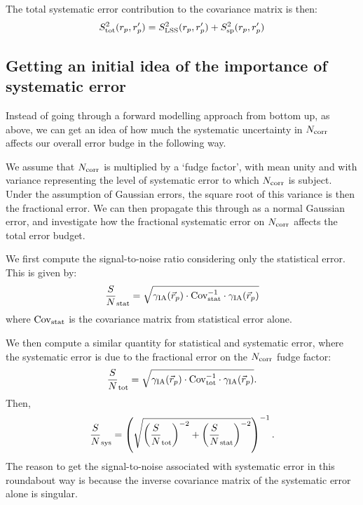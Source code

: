 \documentclass[onecolumn,amsmath,aps,fleqn, superscriptaddress]{revtex4}
\begin{document}
The total systematic error contribution to the covariance matrix is then:
\begin{equation}
S_{\rm tot}^2(r_p, r_p^\prime) = S_{\rm LSS}^2(r_p, r_p^\prime) + S_{\rm sp}^2(r_p, r_p^\prime) 
\label{sysall}
\end{equation}

\subsection{Getting an initial idea of the importance of systematic error}
Instead of going through a forward modelling approach from bottom up, as above, we can get an idea of how much the systematic uncertainty in $N_{\rm corr}$ affects our overall error budge in the following way. 

We assume that $N_{\rm corr}$ is multiplied by a `fudge factor', with mean unity and with variance representing the level of systematic error to which $N_{\rm corr}$ is subject. Under the assumption of Gaussian errors, the square root of this variance is then the fractional error. We can then propagate this through as a normal Gaussian error, and investigate how the fractional systematic error on $N_{\rm corr}$ affects the total error budget.

We first compute the signal-to-noise ratio considering only the statistical error. This is given by:
\begin{equation}
\frac{S}{N}_{\rm stat} = \sqrt{\gamma_{\rm IA}(\vec{r}_p) \cdot {\rm Cov}_{\rm stat}^{-1} \cdot \gamma_{\rm IA}(\vec{r}_p)}
\label{statStoN}
\end{equation}
where ${\rm Cov}_{\rm stat}$ is the covariance matrix from statistical error alone. 

We then compute a similar quantity for statistical and systematic error, where the systematic error is due to the fractional error on the $N_{\rm corr}$ fudge factor:
\begin{equation}
\frac{S}{N}_{\rm tot} = \sqrt{\gamma_{\rm IA}(\vec{r}_p) \cdot {\rm Cov}_{\rm tot}^{-1} \cdot \gamma_{\rm IA}(\vec{r}_p)}.
\label{totStoN}
\end{equation}
Then,
\begin{equation}
\frac{S}{N}_{\rm sys} = \left(\sqrt{\left(\frac{S}{N}_{\rm tot}\right)^{-2} + \left(\frac{S}{N}_{\rm stat}\right)^{-2}}\right)^{-1}.
\label{StoNsys}
\end{equation}
The reason to get the signal-to-noise associated with systematic error in this roundabout way is because the inverse covariance matrix of the systematic error alone is singular.
\end{document}
